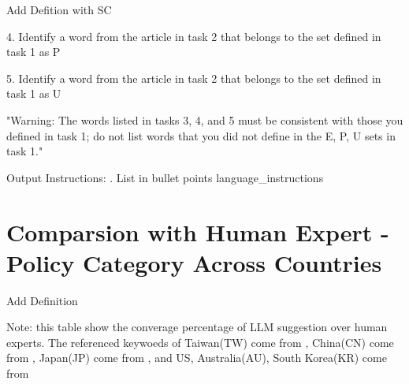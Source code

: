 \documentclass[11.5pt]{beamer}
\begin{document}
\begin{frame}{Add Defition with SC}

4. Identify a word from the article in task 2 that belongs to the set
    defined in task 1 as P \newline

5. Identify a word from the article in task 2 that belongs to the set
    defined in task 1 as U \newline

"Warning: The words listed in tasks 3, 4, and 5 must be consistent with those
you defined in task 1; do not list words that you did not define in the
E, P, U sets in task 1." \newline

Output Instructions: . List in bullet points \newline
{language\_instructions}
\end{frame}


\section{Comparsion with Human Expert - Policy Category Across Countries}


\begin{frame}{Add Definition}
\begin{table}[H]
\renewcommand\arraystretch{1.2}
\begin{adjustwidth}{-0.1cm}{}
\begin{center}
\setlength{\tabcolsep}{30pt}
{
    \fontsize{12}{12} \selectfont
    
}
\end{center}
\end{adjustwidth}
\begin{justify}
{\tiny
    Note: this table show the converage percentage of LLM suggestion over
    human experts. The referenced keywoeds of Taiwan(TW) come from
    \cite{Chen2024}, China(CN) come from \cite{Huang2020}, Japan(JP) come from
    \cite{ArbatliSaxegaard2022}, and US, Australia(AU), South Korea(KR) come
    from \cite{Baker2016}
}
\end{justify}
\end{table}
\end{frame}
\end{document}
